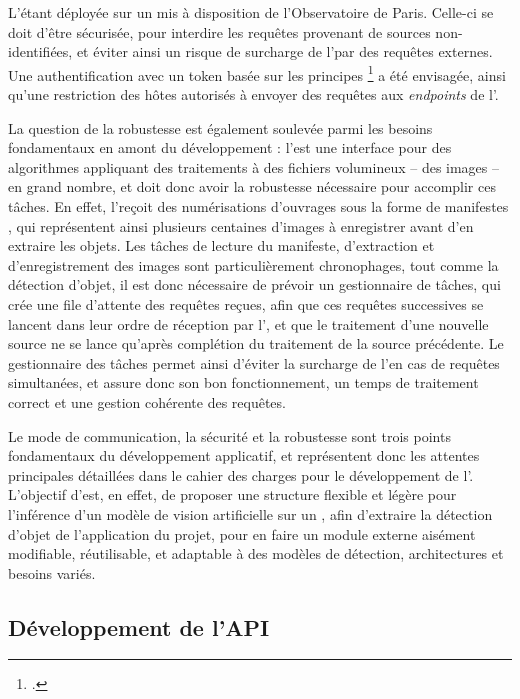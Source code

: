     L'\api étant déployée sur un \gpu mis à disposition de l'Observatoire de Paris. Celle-ci se doit d'être sécurisée, pour interdire les requêtes provenant de sources non-identifiées, et éviter ainsi un risque de surcharge de l'\api par des requêtes externes. Une authentification avec un token basée sur les principes \rest\footcite{grinbergRESTfulAuthenticationFlask} a été envisagée, ainsi qu'une restriction des hôtes autorisés à envoyer des requêtes aux \textit{endpoints} de l'\api.
    
    La question de la robustesse est également soulevée parmi les besoins fondamentaux en amont du développement : l'\api est une interface pour des algorithmes appliquant des traitements à des fichiers volumineux -- des images -- en grand nombre, et doit donc avoir la robustesse nécessaire pour accomplir ces tâches. En effet, l'\api reçoit des numérisations d'ouvrages sous la forme de manifestes \iiif, qui représentent ainsi plusieurs centaines d'images à enregistrer avant d'en extraire les objets. Les tâches de lecture du manifeste, d'extraction et d'enregistrement des images sont particulièrement chronophages, tout comme la détection d'objet, il est donc nécessaire de prévoir un gestionnaire de tâches, qui crée une file d'attente des requêtes reçues, afin que ces requêtes successives se lancent dans leur ordre de réception par l'\api, et que le traitement d'une nouvelle source ne se lance qu'après complétion du traitement de la source précédente. Le gestionnaire des tâches permet ainsi d'éviter la surcharge de l'\api en cas de requêtes simultanées, et assure donc son bon fonctionnement, un temps de traitement correct et une gestion cohérente des requêtes.
    
    Le mode de communication, la sécurité et la robustesse sont trois points fondamentaux du développement applicatif, et représentent donc les attentes principales détaillées dans le cahier des charges pour le développement de l'\api. L'objectif d'\exapi est, en effet, de proposer une structure flexible et légère pour l'inférence d'un modèle de vision artificielle sur un \gpu, afin d'extraire la détection d'objet de l'application du projet, pour en faire un module externe aisément modifiable, réutilisable, et adaptable à des modèles de détection, architectures et besoins variés.
	
\subsection{Développement de l'API}
